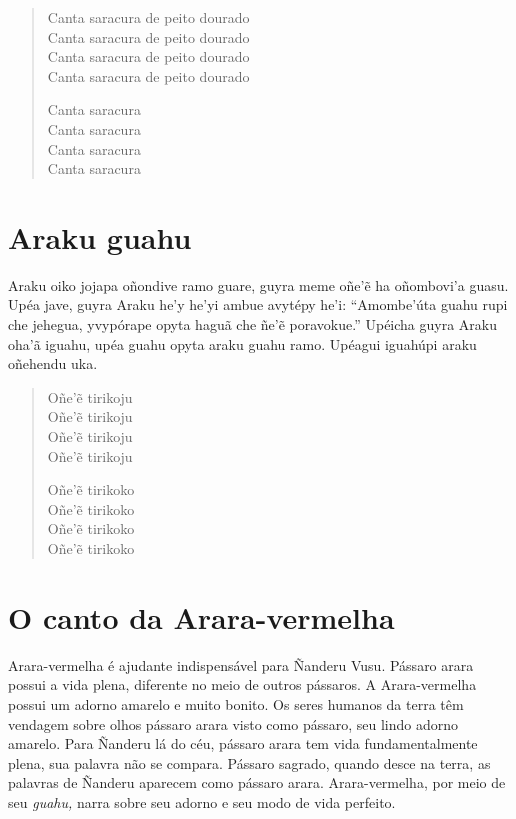 \begin{verse}
Canta saracura de peito dourado\\
Canta saracura de peito dourado\\
Canta saracura de peito dourado\\
Canta saracura de peito dourado

Canta saracura\\
Canta saracura\\
Canta saracura\\
Canta saracura
\end{verse}

\chapter{Araku guahu}

 Araku oiko jojapa oñondive ramo guare, guyra meme oñe'ẽ ha
oñombovi'a guasu. Upéa jave, guyra Araku he'y he'yi ambue avytépy he'i:
``Amombe'úta guahu rupi che jehegua, yvypórape opyta haguã che ñe'ẽ
poravokue.'' Upéicha guyra Araku oha'ã iguahu, upéa guahu opyta araku
guahu ramo. Upéagui iguahúpi araku oñehendu uka.

\begin{verse}
Oñe'ẽ tirikoju\\
Oñe'ẽ tirikoju\\
Oñe'ẽ tirikoju\\
Oñe'ẽ tirikoju

Oñe'ẽ tirikoko\\
Oñe'ẽ tirikoko\\
Oñe'ẽ tirikoko\\
Oñe'ẽ tirikoko
\end{verse}

\chapter{O canto da Arara-vermelha}

 Arara-vermelha é ajudante indispensável para Ñanderu Vusu. Pássaro
arara possui a vida plena, diferente no meio de outros pássaros. A
Arara-vermelha possui um adorno amarelo e muito bonito. Os seres humanos
da terra têm vendagem sobre olhos pássaro arara visto como pássaro, seu
lindo adorno amarelo. Para Ñanderu lá do céu, pássaro arara tem vida
fundamentalmente plena, sua palavra não se compara. Pássaro sagrado,
quando desce na terra, as palavras de Ñanderu aparecem como pássaro
arara. Arara-vermelha, por meio de seu \textit{guahu,} narra sobre seu
adorno e seu modo de vida perfeito.

